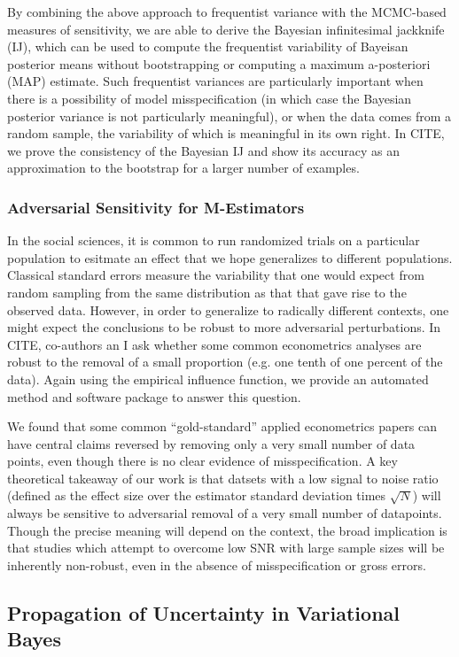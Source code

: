 By combining the above approach to frequentist variance with the MCMC-based
measures of sensitivity, we are able to derive the Bayesian infinitesimal
jackknife (IJ), which can be used to compute the frequentist variability
of Bayeisan posterior means without bootstrapping or computing a maximum
a-posteriori (MAP) estimate.  Such frequentist variances are particularly
important when there is a possibility of model misspecification (in which
case the Bayesian posterior variance is not particularly meaningful),
or when the data comes from a random sample, the variability of which
is meaningful in its own right.  In CITE, we prove the consistency
of the Bayesian IJ and show its accuracy as an approximation to the bootstrap
for a larger number of examples.


\subsubsection*{Adversarial Sensitivity for M-Estimators}

In the social sciences, it is common to run randomized trials on a particular
population to esitmate an effect that we hope generalizes to different
populations.  Classical standard errors measure the variability that one
would expect from random sampling from the same distribution as that that
gave rise to the observed data.  However, in order to generalize to radically
different contexts, one might expect the conclusions to be robust to more
adversarial perturbations.  In CITE, co-authors an I ask whether some
common econometrics analyses are robust to the removal of a small proportion
(e.g. one tenth of one percent of the data).  Again using the empirical
influence function, we provide an automated method and software package
to answer this question.

We found that some common ``gold-standard'' applied econometrics papers
can have central claims reversed by removing only a very small number of
data points, even though there is no clear evidence of misspecification.
A key theoretical takeaway of our work is that datsets with a low signal
to noise ratio (defined as the effect size over the estimator standard
deviation times $\sqrt{N}$) will always be sensitive to adversarial removal
of a very small number of datapoints.  Though the precise meaning will
depend on the context, the broad implication is that studies which
attempt to overcome low SNR with large sample sizes will be inherently
non-robust, even in the absence of misspecification or gross errors.


\subsection*{Propagation of Uncertainty in Variational Bayes}








